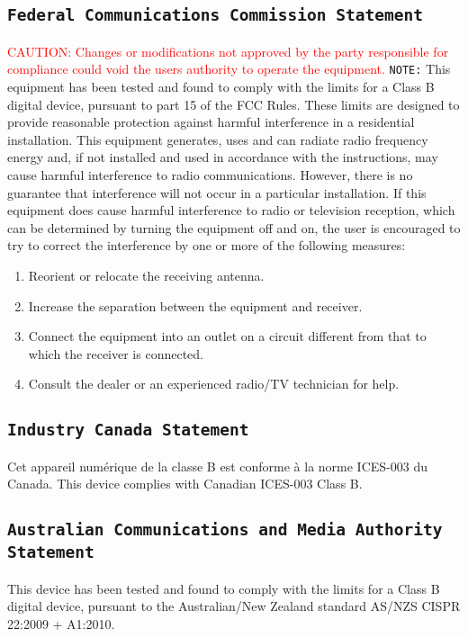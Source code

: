 \subsection{\texttt{Federal Communications Commission Statement}}
\textcolor{red}{CAUTION: Changes or modifications not approved by the party responsible for compliance could void the users authority to operate the equipment.}
\texttt{NOTE:} This equipment has been tested and found to comply with the limits for a Class B digital device, pursuant to part 15 of the FCC Rules. These limits are designed to provide reasonable protection against harmful interference in a residential installation. This equipment generates, uses and can radiate radio frequency energy and, if not installed and used in accordance with the instructions, may cause harmful interference to radio communications. However, there is no guarantee that interference will not occur in a particular installation. If this equipment does cause harmful interference to radio or television reception, which can be determined by turning the equipment off and on, the user is encouraged to try to correct the interference by one or more of the following measures:
\begin{enumerate}
\item Reorient or relocate the receiving antenna.
\item Increase the separation between the equipment and receiver.
\item Connect the equipment into an outlet on a circuit different from that to which the receiver
is connected.
\item Consult the dealer or an experienced radio/TV technician for help.
\end{enumerate}

\subsection{\texttt{Industry Canada Statement}}
Cet appareil numérique de la classe B est conforme à la norme ICES-003 du Canada.
This device complies with Canadian ICES-003 Class B.

\subsection{\texttt{Australian Communications and Media Authority Statement}}
This device has been tested and found to comply with the limits for a Class B digital device, pursuant to the Australian/New Zealand standard AS/NZS CISPR 22:2009 + A1:2010.

